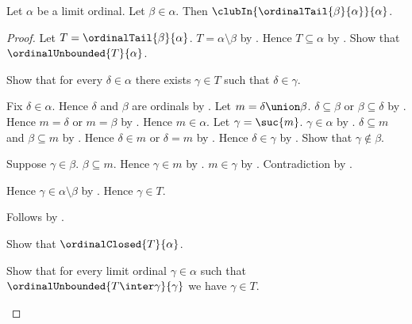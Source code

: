 \begin{proposition}\label{ordinal_tail_is_club}
    Let $\alpha$ be a limit ordinal.
    Let $\beta\in\alpha$.
    Then $\clubIn{\ordinalTail{\beta}{\alpha}}{\alpha}$.
\end{proposition}
\begin{proof}
    Let $T=\ordinalTail{\beta}{\alpha}$.
    $T=\alpha\setminus\beta$ by .
    Hence $T\subseteq\alpha$ by .
    Show that $\ordinalUnbounded{T}{\alpha}$.
    \begin{subproof}
        Show that for every $\delta\in\alpha$ there exists $\gamma\in T$
            such that $\delta\in\gamma$.
        \begin{subproof}
            Fix $\delta\in\alpha$.
            Hence $\delta$ and $\beta$ are ordinals
                by .
            Let $m=\delta\union\beta$.
            $\delta\subseteq\beta$ or $\beta\subseteq\delta$
                by .
            Hence $m=\delta$ or $m=\beta$
                by .
            Hence $m\in\alpha$.
            Let $\gamma=\suc{m}$.
            $\gamma\in\alpha$ by .
            $\delta\subseteq m$ and $\beta\subseteq m$
                by .
            Hence $\delta\in m$ or $\delta=m$
                by .
            Hence $\delta\in\gamma$ by .
            Show that $\gamma\notin\beta$.
            \begin{subproof}
                Suppose $\gamma\in\beta$.
                $\beta\subseteq m$.
                Hence $\gamma\in m$ by .
                $m\in\gamma$ by .
                Contradiction by .
            \end{subproof}
            Hence $\gamma\in\alpha\setminus\beta$
                by .
            Hence $\gamma\in T$.
        \end{subproof}
        Follows by .
    \end{subproof}
    Show that $\ordinalClosed{T}{\alpha}$.
    \begin{subproof}
        Show that for every limit ordinal $\gamma\in\alpha$ such that
            $\ordinalUnbounded{T\inter\gamma}{\gamma}$
            we have $\gamma\in T$.
        \begin{subproof}

\end{subproof}
\end{subproof}
\end{proof}
